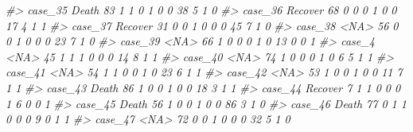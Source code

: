 \documentclass[]{book}
\newenvironment{Shaded}{\begin{snugshade}}{\end{snugshade}}
\newcommand{\CommentTok}[1]{\textcolor[rgb]{0.56,0.35,0.01}{\textit{#1}}}
\begin{document}
\begin{Shaded}
\begin{Highlighting}[]
\CommentTok{#> case_35    Death  83        1        1                0                 1                 0              0                    38                      5           1             0}
\CommentTok{#> case_36  Recover  68        0        0                0                 1                 0              0                    17                      4           1             1}
\CommentTok{#> case_37  Recover  31        0        0                1                 0                 0              0                    45                      7           1             0}
\CommentTok{#> case_38     <NA>  56        0        0                1                 0                 0              0                    23                      7           1             0}
\CommentTok{#> case_39     <NA>  66        1        0                0                 0                 1              0                    13                      0           0             1}
\CommentTok{#> case_4      <NA>  45        1        1                1                 0                 0              0                    14                      8           1             1}
\CommentTok{#> case_40     <NA>  74        1        0                0                 0                 1              0                     6                      5           1             1}
\CommentTok{#> case_41     <NA>  54        1        1                0                 0                 1              0                    23                      6           1             1}
\CommentTok{#> case_42     <NA>  53        1        0                0                 1                 0              0                    11                      7           1             1}
\CommentTok{#> case_43    Death  86        1        0                0                 1                 0              0                    18                      3           1             1}
\CommentTok{#> case_44  Recover   7        1        1                0                 0                 0              1                     6                      0           0             1}
\CommentTok{#> case_45    Death  56        1        0                0                 1                 0              0                    86                      3           1             0}
\CommentTok{#> case_46    Death  77        0        1                1                 0                 0              0                     9                      0           1             1}
\CommentTok{#> case_47     <NA>  72        0        0                1                 0                 0              0                    32                      5           1             0}

\end{Highlighting}
\end{Shaded}
\end{document}
